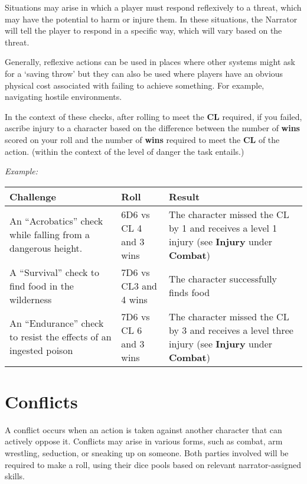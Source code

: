 Situations may arise in which a player must respond reflexively to a threat, which may have the potential to harm or injure them. In these situations, the Narrator will tell the player to respond in a specific way, which will vary based on the threat.

Generally, reflexive actions can be used in places where other systems might ask for a ‘saving throw’ but they can also be used where players have an obvious physical cost associated with failing to achieve something. For example, navigating hostile environments.

In the context of these checks, after rolling to meet the \textbf{CL} required, if you failed, ascribe injury to a character based on the difference between the number of \textbf{wins} scored on your roll and the number of \textbf{wins} required to meet the \textbf{CL} of the action. (within the context of the level of danger the task entails.)

\textit{Example:}

\begin{center}
    \begin{xltabular}{\textwidth}{|X|X|X|} 
        \hline 
        \textbf{Challenge} & \textbf{Roll} & \textbf{Result} \\ 
        \hline
        An “Acrobatics” check while falling from a dangerous height. & 6D6 vs CL 4 and 3 wins & The character missed the CL by 1 and receives a level 1 injury (see \textbf{Injury} under \textbf{Combat}) \\
        A “Survival” check to find food in the wilderness & 7D6 vs CL3 and 4 wins & The character successfully finds food \\
        An “Endurance” check to resist the effects of an ingested poison & 7D6 vs CL 6 and 3 wins & The character missed the CL by 3 and receives a level three injury (see \textbf{Injury} under \textbf{Combat}) \\
        \hline
    \end{xltabular}
\end{center}

\section{Conflicts} \label{sec:conflicts}

A conflict occurs when an action is taken against another character that can actively oppose it. Conflicts may arise in various forms, such as combat, arm wrestling, seduction, or sneaking up on someone. Both parties involved will be required to make a roll, using their dice pools based on relevant narrator-assigned skills.

